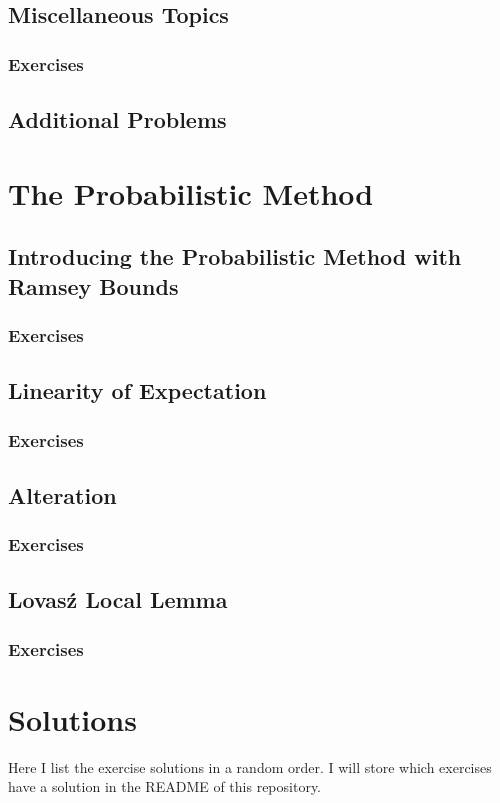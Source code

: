 \documentclass{article}
\begin{document}
\newpage 

\subsection{Miscellaneous Topics}

\subsubsection*{Exercises}

\newpage

\subsection{Additional Problems}

\newpage

\section{The Probabilistic Method}

\subsection{Introducing the Probabilistic Method with Ramsey Bounds}

\subsubsection*{Exercises}

\newpage

\subsection{Linearity of Expectation}

\subsubsection*{Exercises}

\newpage

\subsection{Alteration}

\subsubsection*{Exercises}

\newpage

\subsection{Lovas\'{z} Local Lemma}

\subsubsection*{Exercises}

\newpage

\section{Solutions}

Here I list the exercise solutions in a random order. I will store which exercises have a solution in the README of this repository. 
\end{document}
